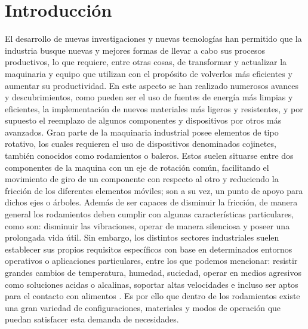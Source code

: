 %
\chapter{Introducción}			%
\label{sec:intro}


El desarrollo de nuevas investigaciones y nuevas tecnologías han permitido que la industria busque nuevas y mejores formas de llevar a cabo sus procesos productivos, lo que requiere, entre otras cosas, de transformar y actualizar la maquinaria y equipo que utilizan con el propósito de volverlos más eficientes y aumentar su productividad.
En este aspecto se han realizado numerosos avances y descubrimientos, como pueden ser el uso de fuentes de energía más limpias y eficientes, la implementación de nuevos materiales más ligeros y resistentes, y por supuesto el reemplazo de algunos componentes y dispositivos por otros más avanzados.
Gran parte de la maquinaria industrial posee elementos de tipo rotativo, los cuales requieren el uso de dispositivos denominados cojinetes, también conocidos como rodamientos o baleros. Estos suelen situarse entre dos componentes de la maquina con un eje de rotación común, facilitando el movimiento de giro de un componente con respecto al otro y reduciendo la fricción de los diferentes elementos móviles; son a su vez, un punto de apoyo para dichos ejes o árboles. 
Además de ser capaces de disminuir la fricción, de manera general los rodamientos deben cumplir con algunas características particulares, como son: disminuir las vibraciones, operar de manera silenciosa y poseer una prolongada vida útil. Sin embargo, los distintos sectores industriales suelen establecer sus propios requisitos específicos con base en determinados entornos operativos o aplicaciones particulares, entre los que podemos mencionar: resistir grandes cambios de temperatura, humedad, suciedad, operar en medios agresivos como soluciones acidas o alcalinas, soportar altas velocidades e incluso ser aptos para el contacto con alimentos \citep{libro_pro}.
Es por ello que dentro de los rodamientos existe una gran variedad de configuraciones, materiales y modos de operación que puedan satisfacer esta demanda de necesidades.



